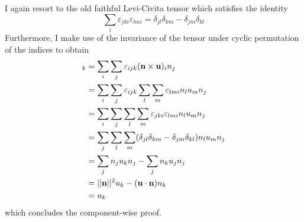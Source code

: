 \documentclass[11pt, a4paper]{article}
\begin{document}
I again resort to the old faithful Levi-Civita tensor which satisfies the
identity
\begin{equation}
    \sum_i \varepsilon_{jki} \varepsilon_{lmi} = \delta_{jl} \delta_{km} - \delta_{jm} \delta_{kl}
\end{equation}
Furthermore, I make use of the invariance of the tensor under cyclic permutation
of the indices to obtain
\begin{align}
    [(\mathbf{n} \times \mathbf{u}) \times \mathbf{n}]_k
    &= \sum_i \sum_j \varepsilon_{ijk} (\mathbf{n} \times \mathbf{u})_i n_j \notag \\ 
    &= \sum_i \sum_j \varepsilon_{ijk} \sum_l \sum_m \varepsilon_{lmi} n_l u_m n_j \notag \\ 
    &= \sum_i \sum_j \sum_l \sum_m \varepsilon_{jki} \varepsilon_{lmi} n_l u_m n_j \notag \\ 
    &= \sum_j \sum_l \sum_m (\delta_{jl} \delta_{km} - \delta_{jm} \delta_{kl}) n_l u_m n_j \notag \\
    &= \sum_j n_j u_k n_j - \sum_j n_k u_j n_j \notag \\
    &= ||\mathbf{n}||^2 u_k - (\mathbf{u} \cdot \mathbf{n}) n_k \notag \\ 
    &= u_k
\end{align}
which concludes the component-wise proof.
\end{document}
